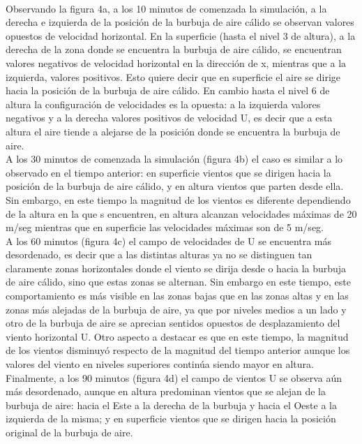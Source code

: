 \documentclass[a4paper, 11 pt]{article}
\begin{document}
\text{}\\Observando la figura 4a, a los 10 minutos de comenzada la simulación, a la derecha e izquierda de la posición de la burbuja de aire cálido se observan valores opuestos de velocidad horizontal. En la superficie (hasta el nivel 3 de altura), a la derecha de la zona donde se encuentra la burbuja de aire cálido, se encuentran valores negativos de velocidad horizontal en la dirección de x, mientras que a la izquierda, valores positivos. Esto quiere decir que en superficie el aire se dirige hacia la posición de la burbuja de aire cálido. En cambio hasta el nivel 6 de altura la configuración de velocidades es la opuesta: a la izquierda valores negativos y a la derecha valores positivos de velocidad U, es decir que a esta altura el aire tiende a alejarse de la posición donde se encuentra la burbuja de aire. \\ A los 30 minutos de comenzada la simulación (figura 4b) el caso es similar a lo observado en el tiempo anterior: en superficie vientos que se dirigen hacia la posición de la burbuja de aire cálido, y en altura vientos que parten desde ella. Sin embargo, en este tiempo la magnitud de los vientos es diferente dependiendo de la altura en la que s encuentren, en altura alcanzan velocidades máximas de 20 m/seg mientras que en superficie las velocidades máximas son de 5 m/seg. \\ A los 60 minutos (figura 4c) el campo de velocidades de U se encuentra más desordenado, es decir que a las distintas alturas ya no se distinguen tan claramente zonas horizontales donde el viento se dirija desde o hacia la burbuja de aire cálido, sino que estas zonas se alternan. Sin embargo en este tiempo, este comportamiento es más visible en las zonas bajas que en las zonas altas y en las zonas más alejadas de la burbuja de aire, ya que por niveles medios a un lado y otro de la burbuja de aire se aprecian sentidos opuestos de desplazamiento del viento horizontal U. Otro aspecto a destacar es que en este tiempo, la magnitud de los vientos disminuyó respecto de la magnitud del tiempo anterior aunque los valores del viento en niveles superiores continúa siendo mayor en altura.\\ Finalmente, a los 90 minutos (figura 4d) el campo de vientos U se observa aún más desordenado, aunque en altura predominan vientos que se alejan de la burbuja de aire: hacia el Este a la derecha de la burbuja y hacia el Oeste a la izquierda de la misma; y en superficie vientos que se dirigen hacia la posición original de la burbuja de aire. 
\end{document}
